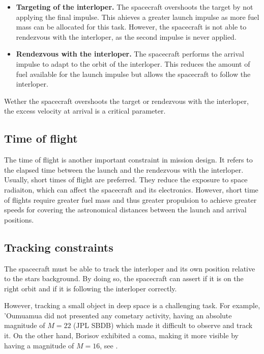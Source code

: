 \begin{itemize}

  \item \textbf{Targeting of the interloper.} The spacecraft overshoots the target by
        not applying the final impulse. This ahieves a greater launch
        impulse as more fuel mass can be allocated for this task. However, the
        spacecraft is not able to rendezvous with the interloper, as the second
        impulse is never applied.

  \item \textbf{Rendezvous with the interloper.} The spacecraft performs the
        arrival impulse to adapt to the orbit of the interloper. This reduces the
        amount of fuel available for the launch impulse but allows the spacecraft to
        follow the interloper.

\end{itemize}

Wether the spacecraft overshoots the target or rendezvous with the interloper,
the excess velocity at arrival is a critical parameter.

\subsection{Time of flight}

The time of flight is another important constraint in mission design. It refers
to the elapsed time between the launch and the rendezvous with the interloper.
Usually, short times of flight are preferred. They reduce the exposure to space
radiaiton, which can affect the spacecraft and its electronics. However, short
time of flights require greater fuel mass and thus greater propulsion to achieve
greater speeds for covering the astronomical distances between the launch and
arrival positions.

\subsection{Tracking constraints}

The spacecraft must be able to track the interloper and its own position
relative to the stars background. By doing so, the spacecraft can assert if it
is on the right orbit and if it is following the interloper correctly.

However, tracking a small object in deep space is a challenging task. For
example, 'Oumuamua did not presented any cometary activity, having an absolute
magnitude of $M = 22$ (JPL SBDB) which made it difficult to observe and track
it. On the other hand, Borisov exhibited a coma, making it more visible by
having a magnitude of $M = 16$, see \cite{jewitt2020}.
